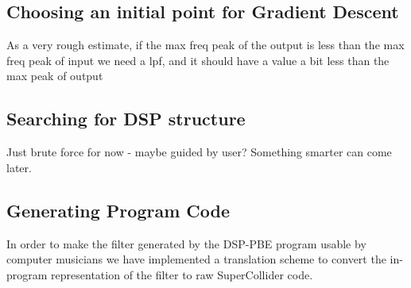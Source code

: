 
\subsection{Choosing an initial point for Gradient Descent}

As a very rough estimate, if the max freq peak of the output is less than the max freq peak of input
  we need a lpf, and it should have a value a bit less than the max peak of output

\subsection{Searching for DSP structure}


Just brute force for now - maybe guided by user? 
Something smarter can come later.

\subsection{Generating Program Code}



In order to make the filter generated by the DSP-PBE program usable by computer musicians we have implemented a translation scheme to convert the in-program representation of the filter to raw SuperCollider code.